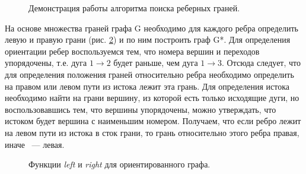 \begin{figure}
\begin{minipage}[H]{0.49\linewidth}
	\end{minipage}
	\caption{Демонстрация работы алгоритма поиска реберных граней.}
	\label{fig:fig11}
\end{figure}

На основе множества граней графа G необходимо для каждого ребра определить левую и правую грани (рис. \ref{fig:fig12}) и по ним построить граф G*. Для определения ориентации ребер воспользуемся тем, что номера вершин и переходов упорядочены, т.е. дуга $ 1 \rightarrow 2 $ будет раньше, чем дуга $ 1 \rightarrow 3 $. Отсюда следует, что для определения положения граней относительно ребра необходимо определить на правом или левом пути из истока лежит эта грань. Для определения истока необходимо найти на грани вершину, из которой есть только исходящие дуги, но воспользовавшись тем, что вершины упорядочены, можно утверждать, что истоком будет вершина с наименьшим номером. Получаем, что если ребро лежит на левом пути из истока в сток грани, то грань относительно этого ребра правая, иначе ~--- левая.

\begin{figure}
	\begin{minipage}[H]{0.49\linewidth}
	\end{minipage}
	\hfill
	\begin{minipage}[H]{0.49\linewidth}
	\end{minipage}
	\caption{Функции \textit{left} и \textit{right} для ориентированного графа.}
	\label{fig:fig12}
\end{figure}

